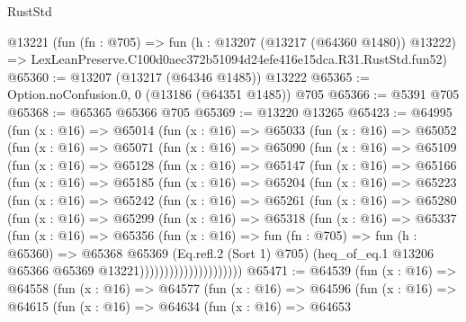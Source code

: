 \begin{lexlean}{RustStd}
\begin{coremodule}
    @13221
    (fun (fn : @705) =>
    fun (h : @13207 (@13217 (@64360 @1480)) @13222) =>
    LexLeanPreserve.C100d0aec372b51094d24efe416e15dca.R31.RustStd.fun52)
@65360 := @13207 (@13217 (@64346 @1485)) @13222
@65365 := Option.noConfusion.{0, 0} (@13186 (@64351 @1485)) @705
@65366 := @5391 @705
@65368 := @65365 @65366 @705
@65369 := @13220 @13265
@65423 := @64995
    (fun (x : @16) =>
    @65014
      (fun (x : @16) =>
      @65033
        (fun (x : @16) =>
        @65052
          (fun (x : @16) =>
          @65071
            (fun (x : @16) =>
            @65090
              (fun (x : @16) =>
              @65109
                (fun (x : @16) =>
                @65128
                  (fun (x : @16) =>
                  @65147
                    (fun (x : @16) =>
                    @65166
                      (fun (x : @16) =>
                      @65185
                        (fun (x : @16) =>
                        @65204
                          (fun (x : @16) =>
                          @65223
                            (fun (x : @16) =>
                            @65242
                              (fun (x : @16) =>
                              @65261
                                (fun (x : @16) =>
                                @65280
                                  (fun (x : @16) =>
                                  @65299
                                    (fun (x : @16) =>
                                    @65318
                                      (fun (x : @16) =>
                                      @65337
                                        (fun (x : @16) =>
                                        @65356
                                          (fun (x : @16) =>
                                          fun (fn : @705) =>
                                          fun (h : @65360) =>
                                          @65368
                                            @65369
                                            (Eq.refl.{2} (Sort 1) @705)
                                            (heq_of_eq.{1}
                                              @13206
                                              @65366
                                              @65369
                                              @13221)))))))))))))))))))))
@65471 := @64539
    (fun (x : @16) =>
    @64558
      (fun (x : @16) =>
      @64577
        (fun (x : @16) =>
        @64596
          (fun (x : @16) =>
          @64615
            (fun (x : @16) =>
            @64634
              (fun (x : @16) =>
              @64653

\end{coremodule}
\end{lexlean}
